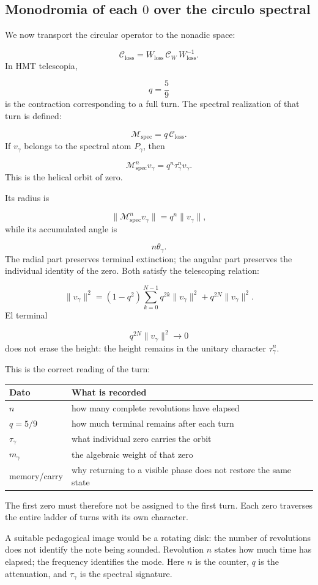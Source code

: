\subsection{Monodromia of each \(0\) over the circulo spectral}
We now transport the circular operator to the nonadic space:\par
\[
\mathcal C_{\mathrm{loss}}
=
W_{\mathrm{loss}}\,
\mathcal C_W\,
W_{\mathrm{loss}}^{-1}.
\]
In HMT telescopia,\par
\[
q=\frac59
\]
is the contraction corresponding to a full turn. The spectral realization of that turn is defined:\par
\[
\mathcal M_{\mathrm{spec}}
=
q\,\mathcal C_{\mathrm{loss}}.
\]
If \(v_\gamma\) belongs to the spectral atom \(P_\gamma\), then\par
\[
\boxed{
\mathcal M_{\mathrm{spec}}^n v_\gamma
=
q^n\tau_\gamma^n v_\gamma.
}
\]
This is the helical orbit of zero.\par
Its radius is\par
\[
\|\mathcal M_{\mathrm{spec}}^n v_\gamma\|
=
q^n\|v_\gamma\|,
\]
while its accumulated angle is\par
\[
n\theta_\gamma.
\]
The radial part preserves terminal extinction; the angular part preserves the individual identity of the zero. Both satisfy the telescoping relation:\par
\[
\|v_\gamma\|^2
=
(1-q^2)
\sum_{k=0}^{N-1}
q^{2k}\|v_\gamma\|^2
+
q^{2N}\|v_\gamma\|^2.
\]
El terminal\par
\[
q^{2N}\|v_\gamma\|^2
\longrightarrow0
\]
does not erase the height: the height remains in the unitary character \(\tau_\gamma^n\).\par
This is the correct reading of the turn:\par
{}
\begin{center}
\small
\begin{tabularx}{\textwidth}{@{}YY@{}}
\toprule
Dato & What is recorded \\
\midrule
\(n\) & how many complete revolutions have elapsed \\
\(q=5/9\) & how much terminal remains after each turn \\
\(\tau_\gamma\) & what individual zero carries the orbit \\
\(m_\gamma\) & the algebraic weight of that zero \\
memory/carry & why returning to a visible phase does not restore the same state \\
\bottomrule
\end{tabularx}
\end{center}
The first zero must therefore not be assigned to the first turn. Each zero traverses the entire ladder of turns with its own character.\par
A suitable pedagogical image would be a rotating disk: the number of revolutions does not identify the note being sounded. Revolution \(n\) states how much time has elapsed; the frequency identifies the mode. Here \(n\) is the counter, \(q\) is the attenuation, and \(\tau_\gamma\) is the spectral signature.\par
{}
